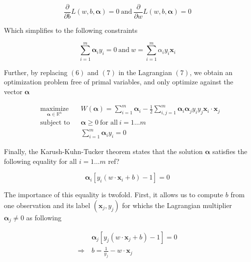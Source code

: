 \begin{equation}
  \frac{\partial}{\partial b}L(w, b, \boldsymbol{\alpha}) = 0
  \ \text{and}\ 
  \frac{\partial}{\partial w}L(w, b, \boldsymbol{\alpha}) = 0
\end{equation}

Which simplifies to the following constraints 

\begin{equation}
  \sum^m_{i=1} \boldsymbol{\alpha}_iy_i = 0
  \ \text{and}\ 
  w = \sum^m_{i=1} \alpha_iy_i\mathbf{x}_i
\end{equation}

Further, by replacing $(6)$ and $(7)$ in the Lagrangian $(7)$, we obtain an optimization problem free of primal variables, and only optimize against the vector $\boldsymbol{\alpha}$

\begin{equation}
  \begin{aligned}
    &\underset{\boldsymbol{\alpha} \in \mathbb{R}^n} {\text{maximize}}
    & & W(\boldsymbol{\alpha}) = \sum_{i=1}^m\boldsymbol{\alpha}_i - \frac{1}{2}\sum_{i,j=1}^m\boldsymbol{\alpha}_i\boldsymbol{\alpha}_jy_iy_j\mathbf{x}_i \cdot \mathbf{x}_j\\
    &\text{subject to}
    & &\boldsymbol{\alpha} \ge 0\ \text{for all}\ i = 1 \dotsc m\\
    & & &\sum^m_{i=1} \boldsymbol{\alpha}_iy_i = 0
  \end{aligned}
\end{equation}

Finally, the Karush-Kuhn-Tucker theorem states that the solution $\boldsymbol{\alpha}$ satisfies the following equality for all $i = 1\dotsc m$
\textcolor[rgb]{1,0,0}{ref?}

\begin{equation}
  \boldsymbol{\alpha}_i[y_i(w \cdot \mathbf{x}_i + b) - 1] = 0
\end{equation}

The importance of this equality is twofold. First, it allows us to compute $b$ from one observation and its label $(\mathbf{x}_j, y_j)$ for whichs the Lagrangian multiplier $\boldsymbol{\alpha}_j \neq 0$ as following

\begin{equation}
  \begin{aligned}
    &\boldsymbol{\alpha}_j[y_j(w \cdot \mathbf{x}_j + b) - 1] = 0\\
    \Rightarrow\ &b = \frac{1}{y_j} - w \cdot \mathbf{x}_j
  \end{aligned}
\end{equation}

